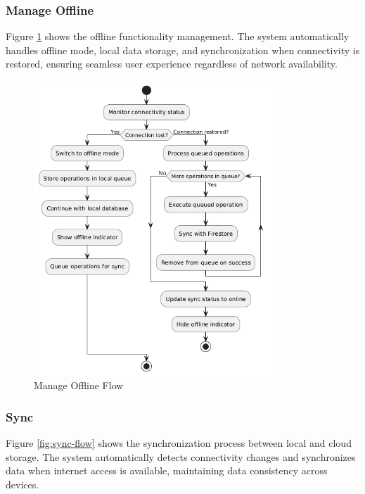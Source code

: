 \subsubsection{Manage Offline}\label{subsubsec:manageOffline}

Figure \ref{fig:manage-offline-flow} shows the offline functionality management. The system automatically handles offline mode, local data storage, and synchronization when connectivity is restored, ensuring seamless user experience regardless of network availability.

\begin{figure}[H]
\centering
\includegraphics[width=0.8\textwidth]{files/imgs/manage_offline_flow.png}
\caption{Manage Offline Flow}
\label{fig:manage-offline-flow}
\end{figure}

\subsubsection{Sync}\label{subsubsec:sync}

Figure \ref{fig:sync-flow} shows the synchronization process between local and cloud storage. The system automatically detects connectivity changes and synchronizes data when internet access is available, maintaining data consistency across devices.

